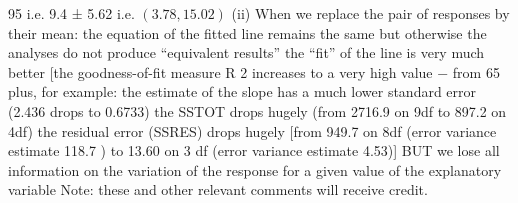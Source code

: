 \documentclass[a4paper,12pt]{article}
\begin{document}
95%
i.e. 9.4 ± 5.62 i.e. $(3.78, 15.02)$
(ii)
When we replace the pair of responses by their mean:
the equation of the fitted line remains the same
but otherwise the analyses do not produce “equivalent results”
the “fit” of the line is very much better [the goodness-of-fit measure R 2 increases
to a very high value − from 65%
plus, for example:
the estimate of the slope has a much lower standard error (2.436 drops to 0.6733)
the SSTOT drops hugely (from 2716.9 on 9df to 897.2 on 4df)
the residual error (SSRES) drops hugely [from 949.7 on 8df (error variance
estimate 118.7 ) to 13.60 on 3 df (error variance estimate 4.53)]
BUT we lose all information on the variation of the response for a given value of
the explanatory variable
Note: these and other relevant comments will receive credit.
\end{document}
